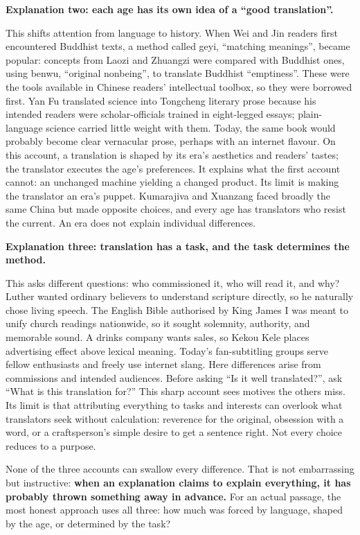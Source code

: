 \textbf{Explanation two: each age has its own idea of a ``good translation''.}

This shifts attention from language to history. When Wei and Jin readers first encountered Buddhist texts, a method called geyi, ``matching meanings'', became popular: concepts from Laozi and Zhuangzi were compared with Buddhist ones, using benwu, ``original nonbeing'', to translate Buddhist ``emptiness''. These were the tools available in Chinese readers' intellectual toolbox, so they were borrowed first. Yan Fu translated science into Tongcheng literary prose because his intended readers were scholar-officials trained in eight-legged essays; plain-language science carried little weight with them. Today, the same book would probably become clear vernacular prose, perhaps with an internet flavour. On this account, a translation is shaped by its era's aesthetics and readers' tastes; the translator executes the age's preferences. It explains what the first account cannot: an unchanged machine yielding a changed product. Its limit is making the translator an era's puppet. Kumarajiva and Xuanzang faced broadly the same China but made opposite choices, and every age has translators who resist the current. An era does not explain individual differences.

\textbf{Explanation three: translation has a task, and the task determines the method.}

This asks different questions: who commissioned it, who will read it, and why? Luther wanted ordinary believers to understand scripture directly, so he naturally chose living speech. The English Bible authorised by King James I was meant to unify church readings nationwide, so it sought solemnity, authority, and memorable sound. A drinks company wants sales, so Kekou Kele places advertising effect above lexical meaning. Today's fan-subtitling groups serve fellow enthusiasts and freely use internet slang. Here differences arise from commissions and intended audiences. Before asking ``Is it well translated?'', ask ``What is this translation for?'' This sharp account sees motives the others miss. Its limit is that attributing everything to tasks and interests can overlook what translators seek without calculation: reverence for the original, obsession with a word, or a craftsperson's simple desire to get a sentence right. Not every choice reduces to a purpose.

None of the three accounts can swallow every difference. That is not embarrassing but instructive: \textbf{when an explanation claims to explain everything, it has probably thrown something away in advance.} For an actual passage, the most honest approach uses all three: how much was forced by language, shaped by the age, or determined by the task?

